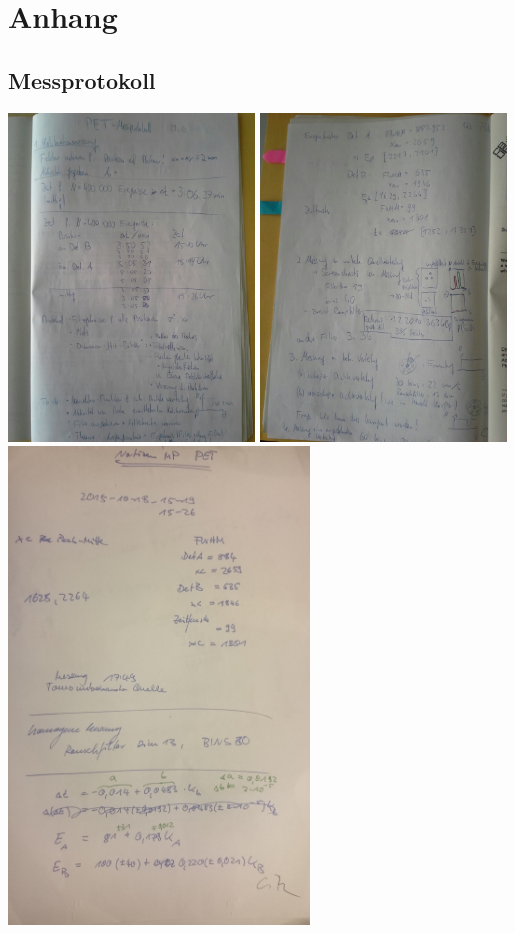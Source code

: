 \section{Anhang}
\subsection{Messprotokoll}
\begin{center}
   \includegraphics[width=0.49\textwidth, height=0.5\textheight]{pic/toni1.jpg}
   \includegraphics[width=0.49\textwidth, height=0.5\textheight]{pic/toni2.jpg}
   \includegraphics[width=0.6\textwidth, height=0.6\textheight]{pic/chri.JPG} 
\end{center}
